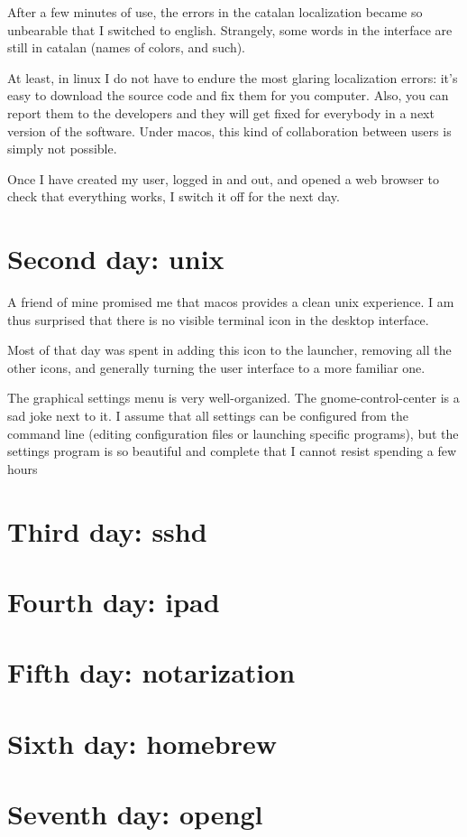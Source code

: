 After a few minutes of use, the errors in the catalan localization became so
unbearable that I switched to english.  Strangely, some words in the
interface are still in catalan (names of colors, and such).

At least, in linux I do not have to endure the most glaring localization
errors: it's easy to download the source code and fix them for you computer.
Also, you can report them to the developers and they will get fixed for
everybody in a next version of the software.  Under macos, this kind of
collaboration between users  is simply not possible.

Once I have created my user, logged in and out, and opened a web browser to
check that everything works, I switch it off for the next day.


\section*{Second day: unix}

A friend of mine promised me that macos provides a clean unix experience.  I
am thus surprised that there is no visible terminal icon in the desktop
interface.

Most of that day was spent in adding this icon to the launcher,
removing all the other icons, and generally turning the user interface to a
more familiar one.

The graphical settings menu is very well-organized.  The gnome-control-center
is a sad joke next to it.   I assume that all settings can be configured from
the command line (editing configuration files or launching specific
programs), but the settings program is so beautiful and complete that I
cannot resist spending a few hours 


\section*{Third day: sshd}

\section*{Fourth day: ipad}

\section*{Fifth day: notarization}

\section*{Sixth day: homebrew}

\section*{Seventh day: opengl}



